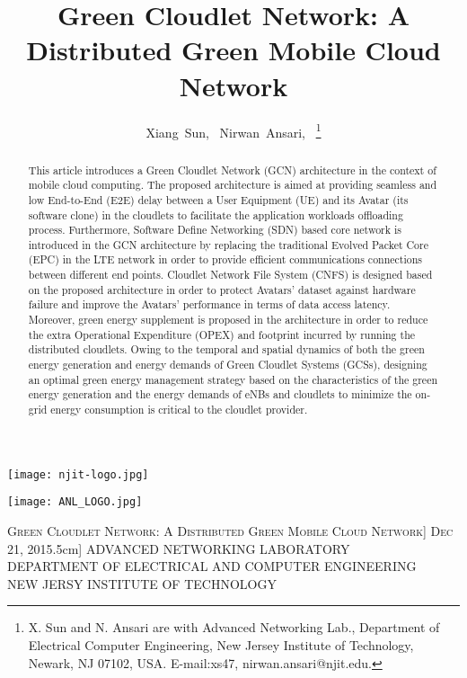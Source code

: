 \documentclass[journal,12pt,draftclsnofoot,onecolumn]{IEEEtran}
\begin{document}
\begin{titlepage}
\begin{center}
\vspace*{-2\baselineskip}
\begin{minipage}[l]{7cm}
\flushleft
\texttt{[image: njit-logo.jpg]}
\end{minipage}
\hfill
\begin{minipage}[r]{7cm}
\flushright
\texttt{[image: ANL\_LOGO.jpg]}
\end{minipage}

\vfill

\textsc{\LARGE Green Cloudlet Network: A Distributed Green Mobile Cloud Network\12pt]
\LARGE Dec 21, 2015}\1.5cm]
\vfill
{ADVANCED NETWORKING LABORATORY\\
 DEPARTMENT OF ELECTRICAL AND COMPUTER ENGINEERING\\
 NEW JERSY INSTITUTE OF TECHNOLOGY}
\end{center}
\end{titlepage}
\title{Green Cloudlet Network: A Distributed Green Mobile Cloud Network}

\author{Xiang~Sun,~
        Nirwan~Ansari,~ 
\thanks{X. Sun and N. Ansari are with Advanced Networking Lab., Department of Electrical  Computer Engineering, New Jersey Institute of Technology, Newark, NJ 07102, USA. E-mail:xs47, nirwan.ansari@njit.edu.}}




\maketitle


\begin{abstract}
This article introduces a Green Cloudlet Network (GCN) architecture in the context of mobile cloud computing. The proposed architecture is aimed at providing seamless and low End-to-End (E2E) delay between a User Equipment (UE) and its Avatar (its software clone) in the cloudlets to facilitate the application workloads offloading process. Furthermore, Software Define Networking (SDN) based core network is introduced in the GCN architecture by replacing the traditional Evolved Packet Core (EPC) in the LTE network in order to provide efficient communications connections between different end points. Cloudlet Network File System (CNFS) is designed based on the proposed architecture in order to protect Avatars' dataset against hardware failure and improve the Avatars' performance in terms of data access latency. Moreover, green energy supplement is proposed in the architecture in order to reduce the extra Operational Expenditure (OPEX) and  footprint incurred by running the distributed cloudlets. Owing to the temporal and spatial dynamics of both the green energy generation and energy demands of Green Cloudlet Systems (GCSs), designing an optimal green energy management strategy based on the characteristics of the green energy generation and the energy demands of eNBs and cloudlets to minimize the on-grid energy consumption is critical to the cloudlet provider.
\end{abstract}
\end{document}
